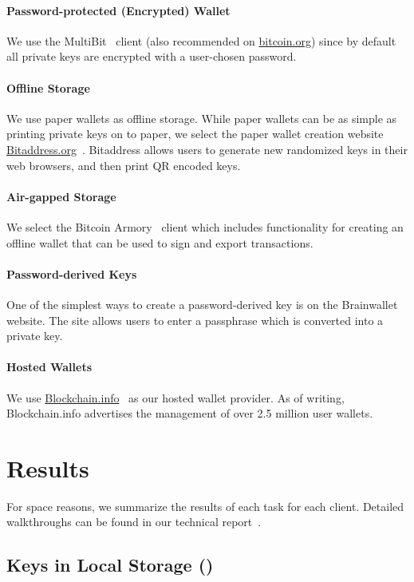 \paragraph{Password-protected (Encrypted) Wallet} We use the MultiBit~\cite{multibit} client (also recommended on \url{bitcoin.org}) since by default all private keys are encrypted with a user-chosen password. 

\paragraph{Offline Storage} We use paper wallets as offline storage. While paper wallets can be as simple as printing private keys on to paper, we select the paper wallet creation website \url{Bitaddress.org}~\cite{bitaddress}. Bitaddress allows users to generate new randomized keys in their web browsers, and then print QR encoded keys. 

\paragraph{Air-gapped Storage} We select the Bitcoin Armory~\cite{bitcoinarmory} client which includes functionality for creating an offline wallet that can be used to sign and export transactions. 

\paragraph{Password-derived Keys} One of the simplest ways to create a password-derived key is on the Brainwallet~\cite{brainwallet} website. The site allows users to enter a passphrase which is converted into a private key. 

\paragraph{Hosted Wallets} We use \url{Blockchain.info}~\cite{blockchain} as our hosted wallet provider. As of writing, Blockchain.info advertises the management of over 2.5 million user wallets.

\section{Results}
For space reasons, we summarize the results of each task for each client. Detailed walkthroughs can be found in our technical report~\cite{shayanTR}. 

\subsection{Keys in Local Storage (\bitcoinclient)}
